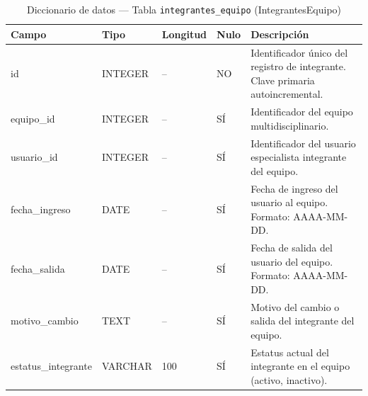 \begin{table}[H]
	\centering
	\caption{Diccionario de datos --- Tabla \texttt{integrantes\_equipo} (IntegrantesEquipo)}
	\label{tab:data-dict-integrantes_equipo}
	\scriptsize
	\begin{tabular}{>{\ttfamily\raggedright\arraybackslash}p{3.6cm} p{1.6cm} p{1.3cm} p{0.7cm} p{5.6cm}}
		\toprule
		\textbf{Campo} & \textbf{Tipo} & \textbf{Longitud} & \textbf{Nulo} & \textbf{Descripción} \\
		\midrule
		id & INTEGER & -- & NO & Identificador único del registro de integrante. Clave primaria autoincremental. \\
		equipo\_id & INTEGER & -- & SÍ & Identificador del equipo multidisciplinario. \\
		usuario\_id & INTEGER & -- & SÍ & Identificador del usuario especialista integrante del equipo. \\
		fecha\_ingreso & DATE & -- & SÍ & Fecha de ingreso del usuario al equipo. Formato: AAAA-MM-DD. \\
		fecha\_salida & DATE & -- & SÍ & Fecha de salida del usuario del equipo. Formato: AAAA-MM-DD. \\
		motivo\_cambio & TEXT & -- & SÍ & Motivo del cambio o salida del integrante del equipo. \\
		estatus\_integrante & VARCHAR & 100 & SÍ & Estatus actual del integrante en el equipo (activo, inactivo). \\
		\bottomrule
	\end{tabular}
\end{table}

